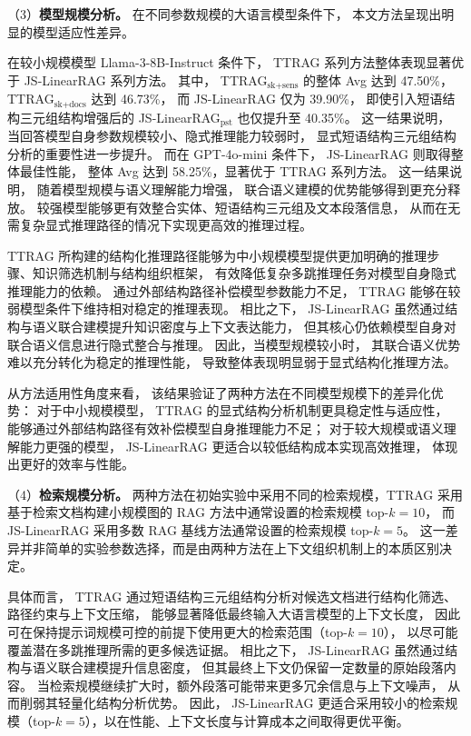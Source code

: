 （3）\textbf{模型规模分析。}
在不同参数规模的大语言模型条件下，
本文方法呈现出明显的模型适应性差异。

在较小规模模型 Llama-3-8B-Instruct 条件下，
TTRAG 系列方法整体表现显著优于 JS-LinearRAG 系列方法。
其中，
TTRAG$_{\text{sk+sens}}$ 的整体 Avg 达到 47.50\%，
TTRAG$_{\text{sk+docs}}$ 达到 46.73\%，
而 JS-LinearRAG 仅为 39.90\%，
即使引入短语结构三元组结构增强后的 JS-LinearRAG$_{\text{pst}}$ 也仅提升至 40.35\%。
这一结果说明，
当回答模型自身参数规模较小、隐式推理能力较弱时，
显式短语结构三元组结构分析的重要性进一步提升。
而在 GPT-4o-mini 条件下，
JS-LinearRAG 则取得整体最佳性能，
整体 Avg 达到 58.25\%，显著优于 TTRAG 系列方法。
这一结果说明，
随着模型规模与语义理解能力增强，
联合语义建模的优势能够得到更充分释放。
较强模型能够更有效整合实体、短语结构三元组及文本段落信息，
从而在无需复杂显式推理路径的情况下实现更高效的推理过程。

TTRAG 所构建的结构化推理路径能够为中小规模模型提供更加明确的推理步骤、知识筛选机制与结构组织框架，
有效降低复杂多跳推理任务对模型自身隐式推理能力的依赖。
通过外部结构路径补偿模型参数能力不足，
TTRAG 能够在较弱模型条件下维持相对稳定的推理表现。
相比之下，
JS-LinearRAG 虽然通过结构与语义联合建模提升知识密度与上下文表达能力，
但其核心仍依赖模型自身对联合语义信息进行隐式整合与推理。
因此，当模型规模较小时，
其联合语义优势难以充分转化为稳定的推理性能，
导致整体表现明显弱于显式结构化推理方法。

从方法适用性角度来看，
该结果验证了两种方法在不同模型规模下的差异化优势：
对于中小规模模型，
TTRAG 的显式结构分析机制更具稳定性与适应性，
能够通过外部结构路径有效补偿模型自身推理能力不足；
对于较大规模或语义理解能力更强的模型，
JS-LinearRAG 更适合以较低结构成本实现高效推理，
体现出更好的效率与性能。

（4）\textbf{检索规模分析。}
两种方法在初始实验中采用不同的检索规模，TTRAG 采用基于检索文档构建小规模图的 RAG 方法中通常设置的检索规模 top-$k=10$，
而 JS-LinearRAG 采用多数 RAG 基线方法通常设置的检索规模 top-$k=5$。
这一差异并非简单的实验参数选择，而是由两种方法在上下文组织机制上的本质区别决定。

具体而言，
TTRAG 通过短语结构三元组结构分析对候选文档进行结构化筛选、路径约束与上下文压缩，
能够显著降低最终输入大语言模型的上下文长度，
因此可在保持提示词规模可控的前提下使用更大的检索范围（top-$k=10$），
以尽可能覆盖潜在多跳推理所需的更多候选证据。
相比之下，
JS-LinearRAG 虽然通过结构与语义联合建模提升信息密度，
但其最终上下文仍保留一定数量的原始段落内容。
当检索规模继续扩大时，额外段落可能带来更多冗余信息与上下文噪声，
从而削弱其轻量化结构分析优势。
因此，
JS-LinearRAG 更适合采用较小的检索规模（top-$k=5$），以在性能、上下文长度与计算成本之间取得更优平衡。


